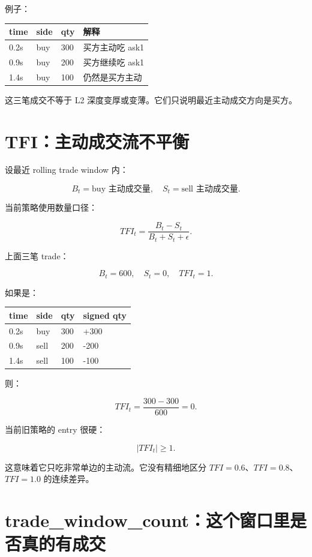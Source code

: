 例子：

\begin{longtable}{p{}p{}p{}p{}}
\toprule
time & side & qty & 解释 \\
\midrule
0.2s & buy & 300 & 买方主动吃 ask1 \\
0.9s & buy & 200 & 买方继续吃 ask1 \\
1.4s & buy & 100 & 仍然是买方主动 \\
\bottomrule
\end{longtable}

这三笔成交不等于 L2 深度变厚或变薄。它们只说明最近主动成交方向是买方。

\section{TFI：主动成交流不平衡}

设最近 rolling trade window 内：

\[
B_t=\text{buy 主动成交量},\quad S_t=\text{sell 主动成交量}.
\]

当前策略使用数量口径：

\[
TFI_t=\frac{B_t-S_t}{B_t+S_t+\epsilon}.
\]

上面三笔 trade：

\[
B_t=600,\quad S_t=0,\quad TFI_t=1.
\]

如果是：

\begin{longtable}{p{}p{}p{}p{}}
\toprule
time & side & qty & signed qty \\
\midrule
0.2s & buy & 300 & +300 \\
0.9s & sell & 200 & -200 \\
1.4s & sell & 100 & -100 \\
\bottomrule
\end{longtable}

则：

\[
TFI_t=\frac{300-300}{600}=0.
\]

当前旧策略的 entry 很硬：

\[
|TFI_t|\ge1.
\]

这意味着它只吃非常单边的主动流。它没有精细地区分 \(TFI=0.6\)、\(TFI=0.8\)、\(TFI=1.0\) 的连续差异。

\section{trade\_window\_count：这个窗口里是否真的有成交}

